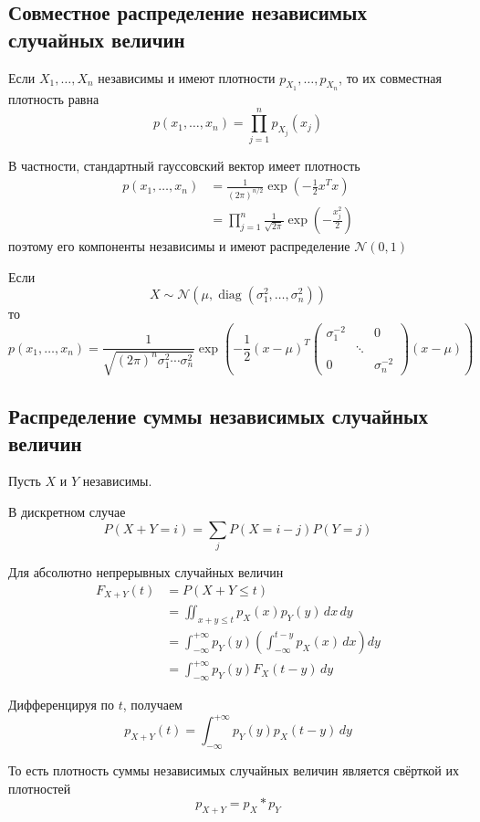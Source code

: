 \documentclass[12pt,a4paper]{article}
\begin{document}
\subsection{Совместное распределение независимых случайных величин}

Если $X_1,\ldots,X_n$ независимы и имеют плотности $p_{X_1},\ldots,p_{X_n}$, то их совместная плотность равна
\[
p(x_1,\ldots,x_n)
=
\prod_{j=1}^n p_{X_j}(x_j)
\]

В частности, стандартный гауссовский вектор имеет плотность
\[
\begin{aligned}
p(x_1,\ldots,x_n)
&=
\frac{1}{(2\pi)^{n/2}}
\exp\left(-\frac12x^Tx\right)\\
&=
\prod_{j=1}^n
\frac{1}{\sqrt{2\pi}}
\exp\left(-\frac{x_j^2}{2}\right)
\end{aligned}
\]
поэтому его компоненты независимы и имеют распределение $\mathcal{N}(0,1)$

Если
\[
X\sim\mathcal{N}
\left(
\mu,
\operatorname{diag}(\sigma_1^2,\ldots,\sigma_n^2)
\right)
\]
то
\[
p(x_1,\ldots,x_n)
=
\frac{1}{\sqrt{(2\pi)^n\sigma_1^2\cdots\sigma_n^2}}
\exp\left(
-\frac12
(x-\mu)^T
\begin{pmatrix}
\sigma_1^{-2} & & 0\\
& \ddots &\\
0 & & \sigma_n^{-2}
\end{pmatrix}
(x-\mu)
\right)
\]

\subsection{Распределение суммы независимых случайных величин}

Пусть $X$ и $Y$ независимы.

В дискретном случае
\[
P(X+Y=i)
=
\sum_jP(X=i-j)P(Y=j)
\]

Для абсолютно непрерывных случайных величин
\[
\begin{aligned}
F_{X+Y}(t)
&=
P(X+Y\leq t)\\
&=
\iint_{x+y\leq t}
p_X(x)p_Y(y)\,dx\,dy\\
&=
\int_{-\infty}^{+\infty}
p_Y(y)
\left(
\int_{-\infty}^{t-y}p_X(x)\,dx
\right)dy\\
&=
\int_{-\infty}^{+\infty}
p_Y(y)F_X(t-y)\,dy
\end{aligned}
\]

Дифференцируя по $t$, получаем
\[
p_{X+Y}(t)
=
\int_{-\infty}^{+\infty}
p_Y(y)p_X(t-y)\,dy
\]

То есть плотность суммы независимых случайных величин является свёрткой их плотностей
\[
p_{X+Y}=p_X*p_Y
\]
\end{document}
